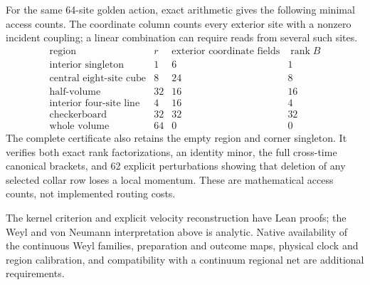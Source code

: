For the same 64-site golden action, exact arithmetic gives the following
minimal access counts. The coordinate column counts every exterior site
with a nonzero incident coupling; a linear combination can require reads
from several such sites.
\[
\begin{array}{lrrr}
\text{region}&r&\text{exterior coordinate fields}&\operatorname{rank}B\\
\hline
\text{interior singleton}&1&6&1\\
\text{central eight-site cube}&8&24&8\\
\text{half-volume}&32&16&16\\
\text{interior four-site line}&4&16&4\\
\text{checkerboard}&32&32&32\\
\text{whole volume}&64&0&0
\end{array}
\]
The complete certificate also retains the empty region and corner
singleton. It verifies both exact rank factorizations, an identity minor,
the full cross-time canonical brackets, and 62 explicit perturbations
showing that deletion of any selected collar row loses a local momentum.
These are mathematical access counts, not implemented routing costs.

The kernel criterion and explicit velocity reconstruction have Lean
proofs; the Weyl and von Neumann interpretation above is analytic.
Native availability of the continuous Weyl families, preparation and
outcome maps, physical clock and region calibration, and compatibility
with a continuum regional net are additional requirements.
